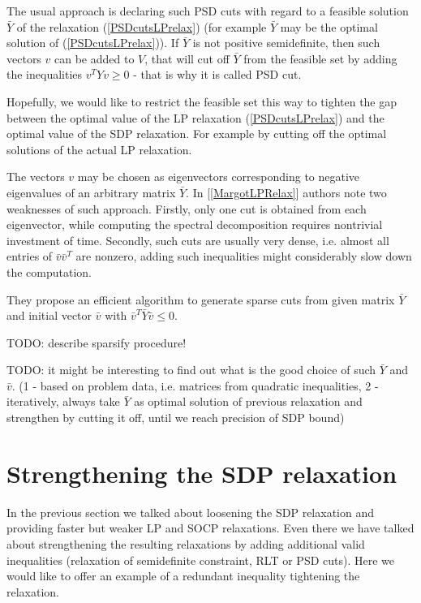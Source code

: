 \documentclass[12pt]{book}
\theoremstyle{definition}
\begin{document}
The usual approach is declaring such PSD cuts with regard to a feasible solution $\bar{Y}$ of the relaxation (\ref{PSDcutsLPrelax}) (for example $\bar{Y}$ may be the optimal solution of (\ref{PSDcutsLPrelax})). If $\bar{Y}$ is not positive semidefinite, then such vectors $v$ can be added to $V$, that will cut off $\bar{Y}$ from the feasible set by adding the inequalities $v^TYv\geq 0$ - that is why it is called PSD cut. 

Hopefully, we would like to restrict the feasible set this way to tighten the gap between the optimal value of the LP relaxation (\ref{PSDcutsLPrelax}) and the optimal value of the SDP relaxation. For example by cutting off the optimal solutions of the actual LP relaxation.


The vectors $v$ may be chosen as eigenvectors corresponding to negative eigenvalues of an arbitrary matrix $\bar{Y}$.
In [\ref{MargotLPRelax}] authors note two weaknesses of such approach. Firstly, only one cut is
obtained from each eigenvector, while computing the spectral decomposition requires nontrivial investment of time. Secondly,
such cuts are usually very dense, i.e. almost all entries of $\bar{v}\bar{v}^T$ are nonzero, adding such inequalities might considerably slow down the computation. 

They propose an efficient algorithm to generate sparse cuts from given matrix $\bar{Y}$ and initial vector $\bar{v}$ with $\bar{v}^{T}\bar{Y}\bar{v} \leq 0$. 

TODO: describe sparsify procedure!

TODO: it might be interesting to find out what is the good choice of such $\bar{Y}$ and $\bar{v}$. 
(1 - based on problem data, i.e. matrices from quadratic inequalities, 
2 - iteratively, always take $\bar{Y}$ as optimal solution of previous relaxation and strengthen by cutting it off, until we reach precision of SDP bound)


\section{Strengthening the SDP relaxation}

In the previous section we talked about loosening the SDP relaxation and providing faster but weaker LP and SOCP relaxations. Even there we have talked about strengthening the resulting relaxations by adding additional valid inequalities (relaxation of semidefinite constraint, RLT or PSD cuts). Here we would like to offer an example of a redundant inequality tightening the relaxation.
\end{document}
